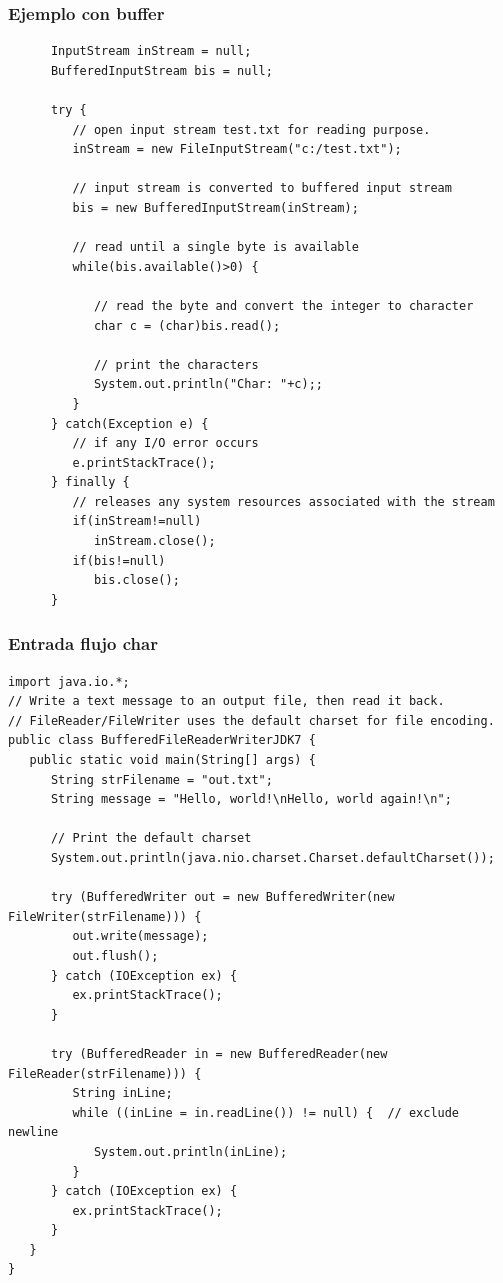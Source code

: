 \documentclass{beamer}
\begin{document}
\begin{frame}[fragile]
\frametitle{Ejemplo con buffer}
\begin{tiny}

\begin{verbatim}
      InputStream inStream = null;
      BufferedInputStream bis = null;
      
      try {
         // open input stream test.txt for reading purpose.
         inStream = new FileInputStream("c:/test.txt");

         // input stream is converted to buffered input stream
         bis = new BufferedInputStream(inStream);			

         // read until a single byte is available
         while(bis.available()>0) {
         
            // read the byte and convert the integer to character
            char c = (char)bis.read();

            // print the characters
            System.out.println("Char: "+c);;
         }
      } catch(Exception e) {
         // if any I/O error occurs
         e.printStackTrace();
      } finally {		
         // releases any system resources associated with the stream
         if(inStream!=null)
            inStream.close();
         if(bis!=null)
            bis.close();
      }
\end{verbatim}
\end{tiny}
\end{frame}


\begin{frame}[fragile]
\frametitle{Entrada flujo char}
\begin{tiny}
\begin{verbatim}
import java.io.*;
// Write a text message to an output file, then read it back.
// FileReader/FileWriter uses the default charset for file encoding.
public class BufferedFileReaderWriterJDK7 {
   public static void main(String[] args) {
      String strFilename = "out.txt";
      String message = "Hello, world!\nHello, world again!\n";  

      // Print the default charset
      System.out.println(java.nio.charset.Charset.defaultCharset());
 
      try (BufferedWriter out = new BufferedWriter(new FileWriter(strFilename))) {
         out.write(message);
         out.flush();
      } catch (IOException ex) {
         ex.printStackTrace();
      }
 
      try (BufferedReader in = new BufferedReader(new FileReader(strFilename))) {
         String inLine;
         while ((inLine = in.readLine()) != null) {  // exclude newline
            System.out.println(inLine);
         }
      } catch (IOException ex) {
         ex.printStackTrace();
      }
   }
}
\end{verbatim}
\end{tiny}
\end{frame}
\end{document}

